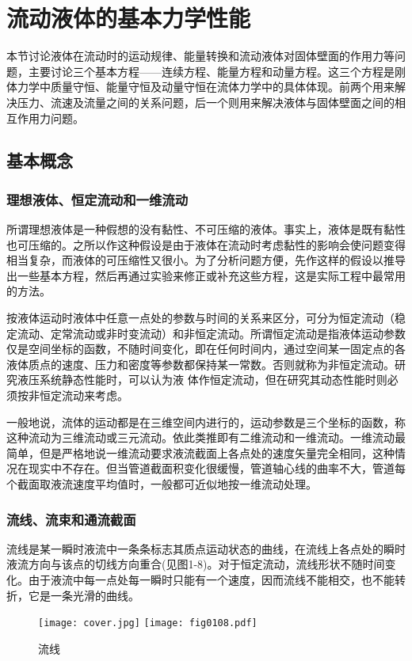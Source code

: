 \chapter{流动液体的基本力学性能}
本节讨论液体在流动时的运动规律、能量转换和流动液体对固体壁面的作用力等问题，主要讨论三个基本方程——连续方程、能量方程和动量方程。这三个方程是刚体力学中质量守恒、能量守恒及动量守恒在流体力学中的具体体现。前两个用来解决压力、流速及流量之间的关系问题，后一个则用来解决液体与固体壁面之间的相互作用力问题。
\section{基本概念}
\subsection{理想液体、恒定流动和一维流动}
所谓理想液体是一种假想的没有黏性、不可压缩的液体。事实上，液体是既有黏性也可压缩的。之所以作这种假设是由于液体在流动时考虑黏性的影响会使问题变得相当复杂，而液体的可压缩性又很小。为了分析问题方便，先作这样的假设以推导出一些基本方程，然后再通过实验来修正或补充这些方程，这是实际工程中最常用的方法。

按液体运动时液体中任意一点处的参数与时间的关系来区分，可分为恒定流动（稳定流动、定常流动或非时变流动）和非恒定流动。所谓恒定流动是指液体运动参数仅是空间坐标的函数，不随时间变化，即在任何时间内，通过空间某一固定点的各液体质点的速度、压力和密度等参数都保持某一常数。否则就称为非恒定流动。研究液压系统静态性能时，可以认为液 体作恒定流动，但在研究其动态性能时则必须按非恒定流动来考虑。

一般地说，流体的运动都是在三维空间内进行的，运动参数是三个坐标的函数，称这种流动为三维流动或三元流动。依此类推即有二维流动和一维流动。一维流动最简单，但是严格地说一维流动要求液流截面上各点处的速度矢量完全相同，这种情况在现实中不存在。但当管道截面积变化很缓慢，管道轴心线的曲率不大，管道每个截面取液流速度平均值时，一般都可近似地按一维流动处理。
\subsection{流线、流束和通流截面}
流线是某一瞬时液流中一条条标志其质点运动状态的曲线，在流线上各点处的瞬时液流方向与该点的切线方向重合(见图1-8)。对于恒定流动，流线形状不随时间变化。由于液流中每一点处每一瞬时只能有一个速度，因而流线不能相交，也不能转折，它是一条光滑的曲线。

    \begin{figure}[!hbt]
    \centering
    \ifOpenSource
    \texttt{[image: cover.jpg]}
    \else
    \texttt{[image: fig0108.pdf]}
    \fi
    \caption{流线}
    \label{fig:fig0108}
    \end{figure}

